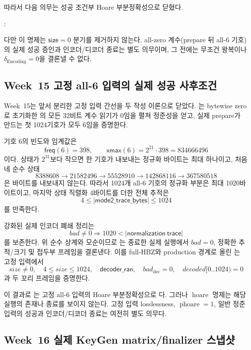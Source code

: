 따라서 다음 의무는 성공 조건부 Hoare 부분정확성으로 닫혔다.
\begin{center}
  : \statusproved
\end{center}
다만 이 명제는 \(\mathsf{size}=0\) 분기를 제거하지 않는다.
all-zero 계수(prepare 뒤 all-6 기호)의 실제 성공 증인과 인코더/디코더 종료는
별도 의무이며, 그 전에는 무조건 왕복이나 \(\delta_{\mathrm{Encoding}}=0\)을
결론낼 수 없다.

\subsection{Week~15 고정 all-6 입력의 실제 성공 사후조건}

Week~15는 앞서 분리한 고정 입력 간선을 두 작성 이론으로 닫았다.
\allowbreak{}는
bytewise zero로 초기화한
의 모든 32비트 계수 읽기가 0임을 펼쳐 정준성을 얻고,
실제 prepare가 만드는 첫 1024기호가 모두 6임을 증명한다.

기호 6의 빈도와 임계값은
\[
  \mathsf{freq}(6)=398,\qquad
  \mathsf{xmax}(6)=2^{21}\cdot398=834666496
\]
이다. 상태가 \(2^{31}\)보다 작으면 한 기호가 내보내는 정규화 바이트는 최대
하나이고, 처음 네 순수 상태
\[
8388608\to21582496\to55528910\to142868116\to367580518
\]
은 바이트를 내보내지 않는다. 따라서 1024개 all-6 기호의 정규화 부분은
최대 1020바이트이고, 마지막 상태 직렬화 4바이트를 더한 전체 추적은
\[
  4\le |\mathsf{mode2\_trace\_bytes}|\le1024
\]
를 만족한다.

강화된 실제 인코더 폐쇄 정리는
\[
  bad\ne0\Longrightarrow
  1020<|\mathsf{normalization\ trace}|
\]
를 보존한다. 위 순수 상계와 모순이므로
는 종료한 실제
 실행에서 \(bad=0\), 정확한 추적/크기 및 접두부
프레임을 결론낸다. 이를 full-HBZ와 production 경계로 올린
는 고정
 입력에서
\[
  size\ne0,\quad 4\le size\le1024,\quad
  \mathsf{decoder\_ran},\quad bad_{\mathrm{dec}}=0,\quad
  decoded[0..1024)=0
\]
과 두 꼬리 프레임을 증명한다.

이 결과로 는 고정 all-6 입력의 Hoare
부분정확성으로 \statusproved 다. 그러나 \(\operatorname{hoare}\) 명제는
해당 실행의 존재나 종료를 보이지 않는다. 고정 입력 losslessness,
\(\operatorname{phoare}=1\), 일반 정준 입력의 성공과 인코더/디코더 종료는
여전히 별도 의무다.

\subsection{Week~16 실제 KeyGen matrix/finalizer 스냅샷}

